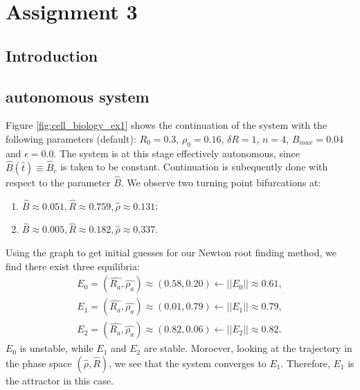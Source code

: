 \section{Assignment 3}

\subsection{Introduction}

\subsection{autonomous system}
Figure \ref{fig:cell_biology_ex1} shows the continuation of the system with the following parameters (default): $R_0 = 0.3$, $\rho_0 = 0.16$, $\delta R = 1$, $n = 4$, $B_{max} = 0.04$ and $\epsilon = 0.0$. 
The system is at this stage effectively autonomous, since $\hat{B}(\hat{t}) \equiv \hat{B}_c$ is taken to be constant. Continuation is subequently done with respect to the parameter $\hat{B}$. We observe two turning point bifurcations at:
\begin{enumerate}
    \item $\hat{B} \approx 0.051, \hat{R}\approx0.759, \hat{\rho}\approx0.131$; 
    \item $\hat{B} \approx 0.005, \hat{R}\approx0.182, \hat{\rho}\approx0.337$.
\end{enumerate}

Using the graph to get initial guesses for our Newton root finding method, we find there exist three equilibria:
\begin{align*}
    E_0=(\hat{R_a}, \hat{\rho_a}) \approx (0.58,0.20) \leftarrow ||E_0|| \approx 0.61, \\
    E_1=(\hat{R_a}, \hat{\rho_a}) \approx (0.01,0.79) \leftarrow ||E_1|| \approx 0.79, \\
    E_2=(\hat{R_a}, \hat{\rho_a}) \approx (0.82,0.06) \leftarrow ||E_2|| \approx 0.82.
\end{align*}
$E_0$ is unstable, while $E_1$ and $E_2$ are stable. Moroever, looking at the trajectory in the phase space $(\hat{\rho}, \hat{R})$, we see that the system converges to $E_1$. 
Therefore, $E_1$ is the attractor in this case.

